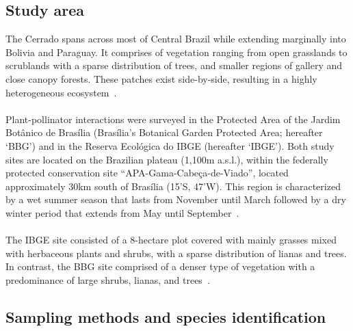 \documentclass[11pt]{article}
\begin{document}
\subsection{Study area}
The Cerrado spans across most of Central Brazil while extending marginally into Bolivia and Paraguay. It comprises of vegetation ranging from open grasslands to scrublands with a sparse distribution of trees, and smaller regions of gallery and close canopy forests. These patches exist side-by-side, resulting in a highly heterogeneous ecosystem~\citep{Gottsberger2006}. \\
\\
Plant-pollinator interactions were surveyed in the Protected Area of the Jardim Bot\^anico de Bras\'ilia (Bras\'ilia's Botanical Garden Protected Area; hereafter `BBG') and in the Reserva Ecol\'ogica do IBGE (hereafter `IBGE'). Both study sites are located on the Brazilian plateau (1,100m a.s.l.), within the federally protected conservation site ``APA-Gama-Cabe\c ca-de-Viado'', located approximately 30km south of Bras\'ilia (15'S, 47'W). This region is characterized by a wet summer season that lasts from November until March followed by a dry winter period that extends from May until September~\citep{Gottsberger2006a}.\\
\\
The IBGE site consisted of a 8-hectare plot covered with mainly grasses mixed with herbaceous plants and shrubs, with a sparse distribution of lianas and trees. In contrast, the BBG site comprised of a denser type of vegetation with a predominance of large shrubs, lianas, and trees~\citep{Eiten1972}.

\subsection{Sampling methods and species identification}
\end{document}
